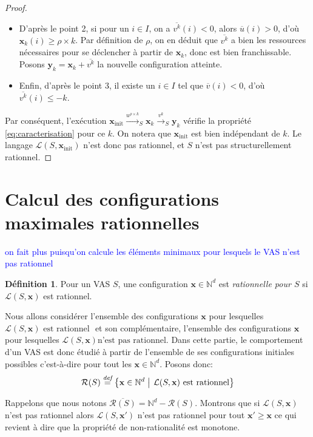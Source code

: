 \documentclass[a4paper,final]{article}
\theoremstyle{definition}
\newtheorem{Definition}[Theorem]{Définition}
\let\leq\leqslant
\let\geq\geqslant
\newcommand{\alain}[1]{\textcolor{blue}{#1}}
\newcommand{\set}[2]{\left\{#1\mathrel{\left|\vphantom{#1}\vphantom{#2}\right.}#2\right\}}
\newcommand{\defeq}{\ensuremath{\stackrel{\textit{def}}{=}}}
\newcommand{\N}{\ensuremath{\mathbb{N}}}
\newcommand{\lang}{\ensuremath{\mathcal{L}}}
\newcommand{\trans}[2]{\ensuremath{\stackrel{#1}{\longrightarrow}_{#2}}}
\newcommand{\vect}[1]{\ensuremath{\mathbf{#1}}}
\newcommand{\xinit}{\ensuremath{\vect{x}_\text{init}}}
\newcommand{\valeur}[1]{\ensuremath{\overline{#1}}}
\newcommand{\inirat}{\mathcal{R}}
\begin{document}
\begin{proof}
\begin{itemize}
    \item D'après le point 2, si pour un $i\in I$, on a $\valeur{v^k}(i) < 0$, alors $\valeur{u}(i) > 0$, d'où $\vect{x}_k(i) \geq \rho\times k$.
    Par définition de $\rho$, on en déduit que $\valeur{v^k}$ a bien les ressources nécessaires pour se déclencher à partir de $\vect{x}_k$, donc est bien franchissable.
    Posons $\vect{y}_k = \vect{x}_k + \valeur{v^k}$ la nouvelle configuration atteinte.
    
    \item Enfin, d'après le point 3, il existe un $i\in I$ tel que $\valeur{v}(i) < 0$, d'où $\valeur{v^k}(i) \leq -k$.
\end{itemize}
Par conséquent, l'exécution $\xinit \trans{u^{\rho\times k}}{S} \vect{x}_k \trans{v^k}{S} \vect{y}_k$ vérifie la propriété \eqref{eq:caracterisation} pour ce $k$.
On notera que $\xinit$ est bien indépendant de $k$.
Le langage $\lang(S,\xinit)$ n'est donc pas rationnel, et $S$ n'est pas structurellement rationnel.
\end{proof}


\section{Calcul des configurations maximales rationnelles}
\alain{on fait plus puisqu'on calcule les éléments minimaux pour lesquels le VAS n'est pas rationnel}

\begin{Definition}
Pour un VAS $S$, une configuration $\vect{x} \in \N^d$ est \emph{rationnelle pour $S$} si $\lang(S,\vect{x})$ est rationnel.
\end{Definition}

Nous allons considérer l'ensemble des configurations $\vect{x}$ pour lesquelles ${\lang(S,\vect{x}) \text{ est rationnel }}$ et son complémentaire, l'ensemble des configurations $\vect{x}$ pour lesquelles ${\lang(S,\vect{x}) \text{n'est pas rationnel}}$. 
%
	Dans cette partie, le comportement d'un VAS est donc étudié à partir de l'ensemble de ses configurations initiales possibles c'est-à-dire pour tout les $\vect{x} \in \N^d$.
%
Posons donc: $$\inirat(S) \defeq \set{\vect{x} \in \N^d} {\lang(S,\vect{x}) \text{ est rationnel}}$$

\noindent
Rappelons que nous notons $\overline{\inirat(S)}
    = \N^d - \inirat(S)$.
%
Montrons que si $\lang(S,\vect{x})$ n'est pas rationnel alors $\lang(S,\vect{x'})$ n'est pas rationnel pour tout $\vect{x'} \geq \vect{x}$ ce qui revient à dire que la propriété de non-rationalité est monotone.
\end{document}

